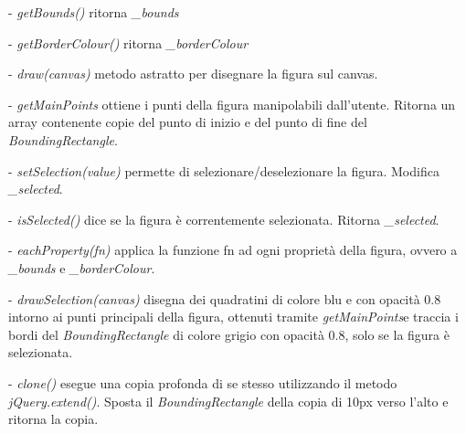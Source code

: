 \begin{elencopuntato}[\subsubsecindent]
\item[-] \textit{getBounds()} ritorna \textit{{\_}bounds}
\item[-] \textit{getBorderColour()} ritorna \textit{{\_}borderColour}
\item[-]  \textit{draw(canvas)} metodo astratto per disegnare la figura sul canvas.
\item[-]  \textit{getMainPoints} ottiene i punti della figura manipolabili dall'utente. Ritorna un array contenente copie del punto di inizio e del punto di fine del \textit{BoundingRectangle}.
\item[-]  \textit{setSelection(value)} permette di selezionare/deselezionare la figura. Modifica \textit{{\_}selected}.
\item[-]  \textit{isSelected()} dice se la figura \`e correntemente selezionata. Ritorna \textit{{\_}selected}.
\item[-]  \textit{eachProperty(fn)} applica la funzione fn ad ogni propriet\`a della figura, ovvero a \textit{{\_}bounds} e \textit{{\_}borderColour}.
\item[-] \textit{drawSelection(canvas)} disegna dei quadratini di colore blu e con opacit\`a 0.8 intorno ai punti principali della figura, ottenuti tramite \textit{getMainPoints}e traccia i bordi del \textit{BoundingRectangle} di colore grigio con opacit\`a 0.8, solo se la figura \`e selezionata. 
\item[-] \textit{clone()} esegue una copia profonda di se stesso utilizzando il metodo \textit{jQuery.extend()}. Sposta il \textit{BoundingRectangle} della copia di 10px verso l'alto e ritorna la copia.
\end{elencopuntato}

